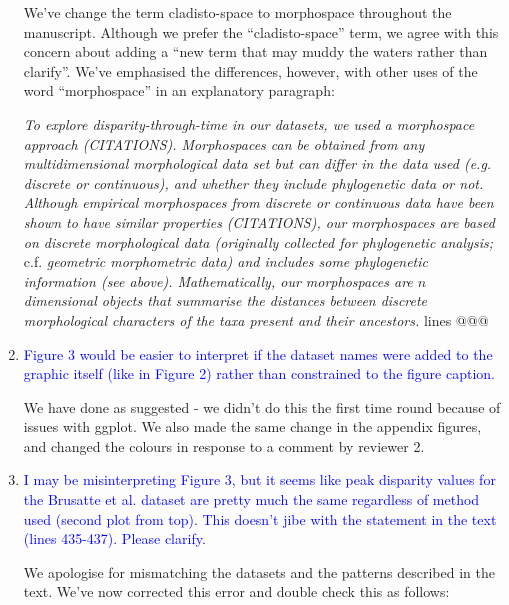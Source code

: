 \documentclass[12pt,letterpaper]{article}
\begin{document}
\begin{enumerate}
We've change the term cladisto-space to morphospace throughout the manuscript.
Although we prefer the ``cladisto-space'' term, we agree with this concern about adding a ``new term that may muddy the waters rather than clarify''.
We've emphasised the differences, however, with other uses of the word ``morphospace'' in an explanatory paragraph:

\textit{To explore disparity-through-time in our datasets, we used a morphospace approach (CITATIONS).
Morphospaces can be obtained from any multidimensional morphological data set but can differ in the data used (e.g. discrete or continuous), and whether they include phylogenetic data or not. %
Although empirical morphospaces from discrete or continuous data have been shown to have similar properties (CITATIONS), our morphospaces are based on discrete morphological data (originally collected for phylogenetic analysis;} c.f. \textit{geometric morphometric data) and includes some phylogenetic information (see above).
Mathematically, our morphospaces are $n$ dimensional objects that summarise the distances between discrete morphological characters of the taxa present and their ancestors.} lines @@@


\item{\textcolor{blue}{Figure 3 would be easier to interpret if the dataset names were added to the graphic itself (like in Figure 2) rather than constrained to the figure caption.}}

We have done as suggested - we didn't do this the first time round because of issues with ggplot. We also made the same change in the appendix figures, and changed the colours in response to a comment by reviewer 2.


\item{\textcolor{blue}{I may be misinterpreting Figure 3, but it seems like peak disparity values for the Brusatte et al. dataset are pretty much the same regardless of method used (second plot from top). This doesn't jibe with the statement in the text (lines 435-437). Please clarify.}}
\label{fig3_feckup}

We apologise for mismatching the datasets and the patterns described in the text.
We've now corrected this error and double check this as follows:


\end{enumerate}
\end{document}
